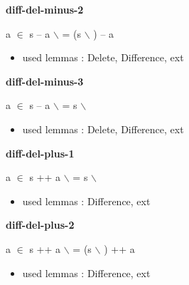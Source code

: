 \documentclass[a4paper]{article}
\begin{document}
\medskip

\bigskip

{\large\bf diff-del-minus-2}

\medskip

 \Fol \Not a $\in$  \Imp s -- a $\backslash$  = (s $\backslash$ ) -- a

\begin{itemize}


\item       used lemmas  : Delete, Difference, ext

\end{itemize}

\medskip

\bigskip

{\large\bf diff-del-minus-3}

\medskip

 \Fol a $\in$  \Imp s -- a $\backslash$  = s $\backslash$ 

\begin{itemize}


\item       used lemmas  : Delete, Difference, ext

\end{itemize}

\medskip

\bigskip

{\large\bf diff-del-plus-1}

\medskip

 \Fol a $\in$  \Imp s ++ a $\backslash$  = s $\backslash$ 

\begin{itemize}


\item       used lemmas  : Difference, ext

\end{itemize}

\medskip

\bigskip

{\large\bf diff-del-plus-2}

\medskip

 \Fol \Not a $\in$  \Imp s ++ a $\backslash$  = (s $\backslash$ ) ++ a

\begin{itemize}


\item       used lemmas  : Difference, ext

\end{itemize}
\end{document}
